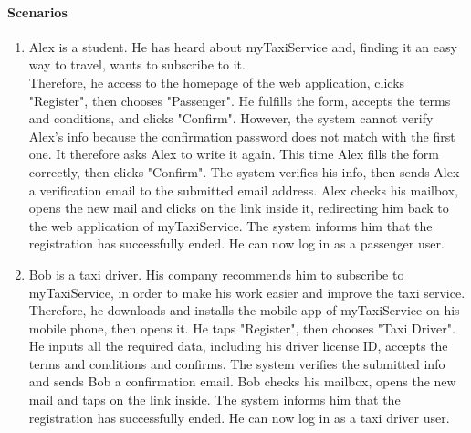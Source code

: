 \paragraph{Scenarios}
	\begin{enumerate}
		\item Alex is a student. He has heard about myTaxiService and, finding it an easy way to travel, wants to subscribe to it.\\
		Therefore, he access to the homepage of the web application, clicks "Register", then chooses "Passenger". He fulfills the form, accepts the terms and conditions, and clicks "Confirm". However, the system cannot verify Alex's info because the confirmation password does not match with the first one. It therefore asks Alex to write it again. This time Alex fills the form correctly, then clicks "Confirm". The system verifies his info, then sends Alex a verification email to the submitted email address. Alex checks his mailbox, opens the new mail and clicks on the link inside it, redirecting him back to the web application of myTaxiService. The system informs him that the registration has successfully ended. He can now log in as a passenger user.
			
		\item Bob is a taxi driver. His company recommends him to subscribe to myTaxiService, in order to make his work easier and improve the taxi service.\\
		Therefore, he downloads and installs the mobile app of myTaxiService on his mobile phone, then opens it. He taps "Register", then chooses "Taxi Driver". He inputs all the required data, including his driver license ID, accepts the terms and conditions and confirms. The system verifies the submitted info and sends Bob a confirmation email. Bob checks his mailbox, opens the new mail and taps on the link inside. The system informs him that the registration has successfully ended. He can now log in as a taxi driver user.
	\end{enumerate}

